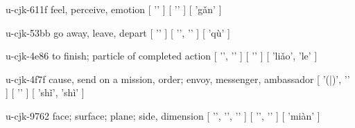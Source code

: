 \begin{multicols}{2}
\lettrine[lines=3]{\cjkgGlue{}}{}\begin{minipage}{0.8\linewidth} u-cjk-611f  feel, perceive, emotion  [ '\cjkgGlue{}' ]  [ '\cjkgGlue{}' ]  [ 'gǎn' ] \end{minipage}

\lettrine[lines=3]{\cjkgGlue{}}{}\begin{minipage}{0.8\linewidth} u-cjk-53bb  go away, leave, depart  [ '\cjkgGlue{}' ]  [ '\cjkgGlue{}', '\cjkgGlue{}' ]  [ 'qù' ] \end{minipage}

\lettrine[lines=3]{\cjkgGlue{}}{}\begin{minipage}{0.8\linewidth} u-cjk-4e86  to finish; particle of completed action  [ '\cjkgGlue{}', '\cjkgGlue{}' ]  [ '\cjkgGlue{}' ]  [ 'liǎo', 'le' ] \end{minipage}

\lettrine[lines=3]{\cjkgGlue{}}{}\begin{minipage}{0.8\linewidth} u-cjk-4f7f  cause, send on a mission, order; envoy, messenger, ambassador  [ '\cjkgGlue{}(\cjkgGlue{}|\cjkgGlue{})', '\cjkgGlue{}' ]  [ '\cjkgGlue{}' ]  [ 'shǐ', 'shì' ] \end{minipage}

\lettrine[lines=3]{\cjkgGlue{}}{}\begin{minipage}{0.8\linewidth} u-cjk-9762  face; surface; plane; side, dimension  [ '\cjkgGlue{}', '\cjkgGlue{}', '\cjkgGlue{}' ]  [ '\cjkgGlue{}', '\cjkgGlue{}' ]  [ 'miàn' ] \end{minipage}


\end{multicols}
